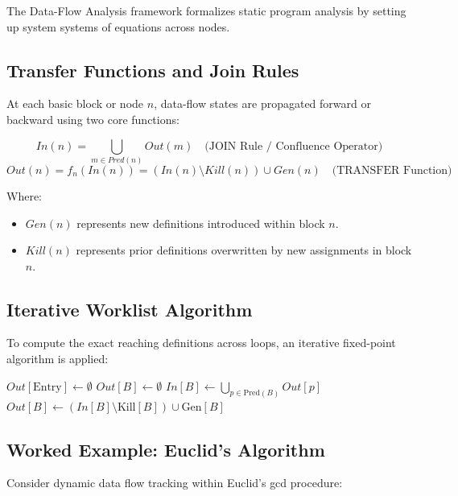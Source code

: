 The Data-Flow Analysis framework formalizes static program analysis by setting up system systems of equations across nodes.

\subsection{Transfer Functions and Join Rules}
At each basic block or node $n$, data-flow states are propagated forward or backward using two core functions:

\begin{equation}
In(n) = \bigcup_{m \in Pred(n)} Out(m) \quad \text{(JOIN Rule / Confluence Operator)}
\end{equation}
\begin{equation}
Out(n) = f_n(In(n)) = (In(n) \setminus Kill(n)) \cup Gen(n) \quad \text{(TRANSFER Function)}
\end{equation}

Where:
\begin{itemize}
    \item $Gen(n)$ represents new definitions introduced within block $n$.
    \item $Kill(n)$ represents prior definitions overwritten by new assignments in block $n$.
\end{itemize}

\subsection{Iterative Worklist Algorithm}
To compute the exact reaching definitions across loops, an iterative fixed-point algorithm is applied:

\begin{algorithm}[H]
\caption{Iterative Reaching Definitions Algorithm}
\label{alg:reaching_definitions}
\begin{algorithmic}[1]
\State $Out[\text{Entry}] \gets \emptyset$
    \State $Out[B] \gets \emptyset$
\EndFor
{}
        \State $In[B] \gets \bigcup_{p \in \text{Pred}(B)} Out[p]$
        \State $Out[B] \gets (In[B] \setminus \text{Kill}[B]) \cup \text{Gen}[B]$
    \EndFor
\EndWhile
\end{algorithmic}
\end{algorithm}

\subsection{Worked Example: Euclid's  Algorithm}
Consider dynamic data flow tracking within Euclid's \gls{gcd} procedure:

